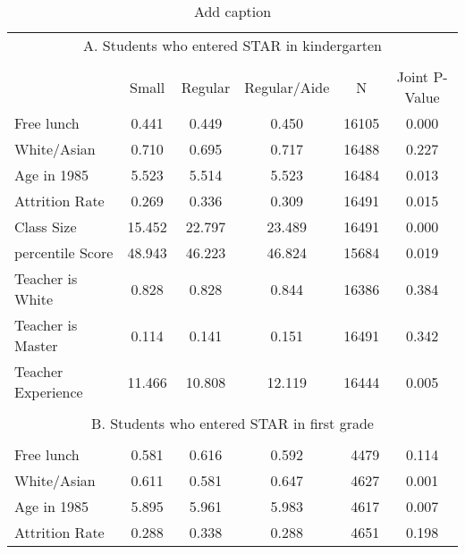 \documentclass{article}
\begin{document}

\begin{table}[htbp]
  \centering
  \caption{Add caption}
    \begin{tabular}{llcccrc}
    \toprule
    \multicolumn{7}{c}{A. Students who entered STAR in kindergarten} \\
          &       &       &       &       &       &  \\
          &       & Small & Regular & Regular/Aide & \multicolumn{1}{c}{N} & Joint P-Value \\
    \midrule
    \multicolumn{2}{l}{Free lunch} & 0.441  & 0.449  & 0.450  & 16105 & 0.000  \\
    \multicolumn{2}{l}{White/Asian} & 0.710  & 0.695  & 0.717  & 16488 & 0.227  \\
    \multicolumn{2}{l}{Age in 1985} & 5.523  & 5.514  & 5.523  & 16484 & 0.013  \\
    \multicolumn{2}{l}{Attrition Rate} & 0.269  & 0.336  & 0.309  & 16491 & 0.015  \\
    \multicolumn{2}{l}{Class Size} & 15.452  & 22.797  & 23.489  & 16491 & 0.000  \\
    \multicolumn{2}{l}{percentile Score} & 48.943  & 46.223  & 46.824  & 15684 & 0.019  \\
    \multicolumn{2}{l}{Teacher is White} & 0.828  & 0.828  & 0.844  & 16386 & 0.384  \\
    \multicolumn{2}{l}{Teacher is Master} & 0.114  & 0.141  & 0.151  & 16491 & 0.342  \\
    \multicolumn{2}{l}{Teacher Experience} & 11.466  & 10.808  & 12.119  & 16444 & 0.005  \\
          &       &       &       &       &       &  \\
    \multicolumn{7}{c}{B. Students who entered STAR in first grade} \\
          &       &       &       &       &       &  \\
    \multicolumn{2}{l}{Free lunch} & 0.581  & 0.616  & 0.592  & 4479  & 0.114  \\
    \multicolumn{2}{l}{White/Asian} & 0.611  & 0.581  & 0.647  & 4627  & 0.001  \\
    \multicolumn{2}{l}{Age in 1985} & 5.895  & 5.961  & 5.983  & 4617  & 0.007  \\
    \multicolumn{2}{l}{Attrition Rate} & 0.288  & 0.338  & 0.288  & 4651  & 0.198  \\

\end{tabular}
\end{table}
\end{document}
